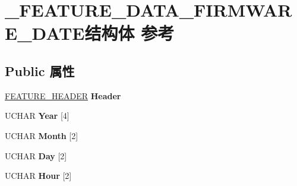 \hypertarget{struct___f_e_a_t_u_r_e___d_a_t_a___f_i_r_m_w_a_r_e___d_a_t_e}{}\section{\+\_\+\+F\+E\+A\+T\+U\+R\+E\+\_\+\+D\+A\+T\+A\+\_\+\+F\+I\+R\+M\+W\+A\+R\+E\+\_\+\+D\+A\+T\+E结构体 参考}
\label{struct___f_e_a_t_u_r_e___d_a_t_a___f_i_r_m_w_a_r_e___d_a_t_e}
\subsection*{Public 属性}
\begin{DoxyCompactItemize}
\item 
\mbox{\label{struct___f_e_a_t_u_r_e___d_a_t_a___f_i_r_m_w_a_r_e___d_a_t_e_a8d938c635782adf3f515869f186f05a2}} 
\hyperlink{struct___f_e_a_t_u_r_e___h_e_a_d_e_r}{F\+E\+A\+T\+U\+R\+E\+\_\+\+H\+E\+A\+D\+ER} {\bfseries Header}
\item 
\mbox{\label{struct___f_e_a_t_u_r_e___d_a_t_a___f_i_r_m_w_a_r_e___d_a_t_e_a875b3f32ff40c59e3036888895fc0853}} 
U\+C\+H\+AR {\bfseries Year} \mbox{[}4\mbox{]}
\item 
\mbox{\label{struct___f_e_a_t_u_r_e___d_a_t_a___f_i_r_m_w_a_r_e___d_a_t_e_a62db4ac01bdc383ccdc0a9b7b2c40d0f}} 
U\+C\+H\+AR {\bfseries Month} \mbox{[}2\mbox{]}
\item 
\mbox{\label{struct___f_e_a_t_u_r_e___d_a_t_a___f_i_r_m_w_a_r_e___d_a_t_e_af7a5b4a97977c860e6ce9d277d74157b}} 
U\+C\+H\+AR {\bfseries Day} \mbox{[}2\mbox{]}
\item 
\mbox{\label{struct___f_e_a_t_u_r_e___d_a_t_a___f_i_r_m_w_a_r_e___d_a_t_e_a10b50f926677bdd3d5c334d22d60e8f9}} 
U\+C\+H\+AR {\bfseries Hour} \mbox{[}2\mbox{]}
\item 
\mbox{\label{struct___f_e_a_t_u_r_e___d_a_t_a___f_i_r_m_w_a_r_e___d_a_t_e_a9f7948b557d473609c885c92254d3376}} 

\end{DoxyCompactItemize}
